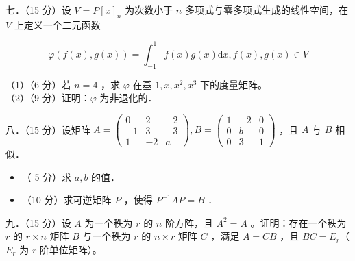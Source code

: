 \documentclass{article}
\begin{document}
七．（15 分）设 \(V=P[x]_{n}\) 为次数小于 \(n\) 多项式与零多项式生成的线性空间，在 \(V\) 上定义一个二元函数

\[
\varphi(f(x), g(x))=\int_{-1}^{1} f(x) g(x) \mathrm{d} x, f(x), g(x) \in V
\]

（1）（6 分）若 \(n=4\) ，求 \(\varphi\) 在基 \(1, x, x^{2}, x^{3}\) 下的度量矩阵。\\
（2）（9 分）证明：\(\varphi\) 为非退化的．

八．（15 分）设矩阵 \(A=\left(\begin{array}{ccc}0 & 2 & -2 \\ -1 & 3 & -3 \\ 1 & -2 & a\end{array}\right), B=\left(\begin{array}{ccc}1 & -2 & 0 \\ 0 & b & 0 \\ 0 & 3 & 1\end{array}\right)\) ，且 \(A\) 与 \(B\) 相似．

\begin{itemize}
  \item[（1）] （ 5 分）求 \(a, b\) 的值．
  \item[（2）] （10 分）求可逆矩阵 \(P\) ，使得 \(P^{-1} A P=B\) ．
\end{itemize}

九．（15 分）设 \(A\) 为一个秩为 \(r\) 的 \(n\) 阶方阵，且 \(A^{2}=A\) 。证明：存在一个秩为 \(r\) 的 \(r \times n\) 矩阵 \(B\) 与一个秩为 \(r\) 的 \(n \times r\) 矩阵 \(C\) ，满足 \(A=C B\) ，且 \(B C=E_{r}\)（ \(E_{r}\) 为 \(r\) 阶单位矩阵）。
\end{document}
